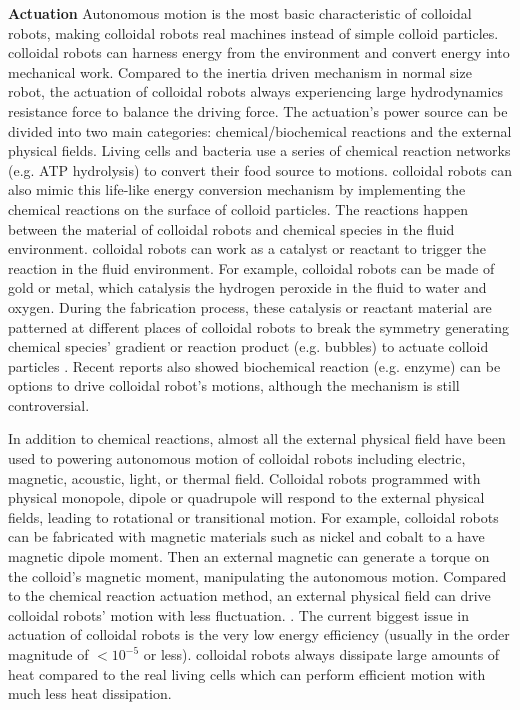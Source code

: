 \textbf{Actuation} Autonomous motion is the most basic characteristic of colloidal robots, making colloidal robots real machines instead of simple colloid particles. colloidal robots can harness energy from the environment and convert energy into mechanical work. Compared to the inertia driven mechanism in normal size robot, the actuation of colloidal robots always experiencing large hydrodynamics resistance force to balance the driving force. The actuation's power source can be divided into two main categories: chemical/biochemical reactions and the external physical fields. Living cells and bacteria use a series of  chemical reaction networks (e.g. ATP hydrolysis) to convert their food source to motions. colloidal robots can also mimic this life-like energy conversion mechanism by implementing the chemical reactions on the surface of colloid particles. The reactions happen between the material of colloidal robots and chemical species in the fluid environment. colloidal robots can work as a catalyst or reactant to trigger the reaction in the fluid environment. For example,  colloidal robots can be made of gold or metal,  which catalysis the hydrogen peroxide in the fluid to water and oxygen. During the fabrication process, these catalysis or reactant material are patterned at different places of colloidal robots to break the symmetry generating chemical species' gradient or reaction product (e.g. bubbles) to actuate colloid particles \autocite{velegol2016origins,shklyaev2016harnessing,parmar2018micro}. Recent reports also showed biochemical reaction (e.g. enzyme) can be options to drive colloidal robot's motions, although the mechanism is still controversial\autocite{zhao2018substrate,somasundar2019positive}.

In addition to  chemical reactions, almost all the external physical field have been used to powering autonomous motion of colloidal robots including electric\autocite{lee2019directed}, magnetic\autocite{zhang2009artificial}, acoustic\autocite{sabrina2018shape}, light\autocite{dai2016programmable}, or thermal field\autocite{lozano2016phototaxis}.  Colloidal robots programmed with physical monopole, dipole or quadrupole will respond to the external physical fields, leading to rotational or transitional motion. For example, colloidal robots can be fabricated with magnetic materials such as nickel and cobalt to a have magnetic dipole moment. Then an external magnetic can generate a torque on the colloid's magnetic moment, manipulating the autonomous motion. Compared to the  chemical reaction actuation method, an external physical field can drive colloidal robots' motion with less fluctuation. \autocite{han2018engineering,ren2018two}. 
The current biggest issue in actuation of colloidal robots is the very low energy efficiency (usually in the order magnitude of $<10^{-5}$ or less). colloidal robots always dissipate large amounts of heat\autocite{wang2013understanding} compared to the real living cells which can perform efficient motion with much less heat dissipation.

